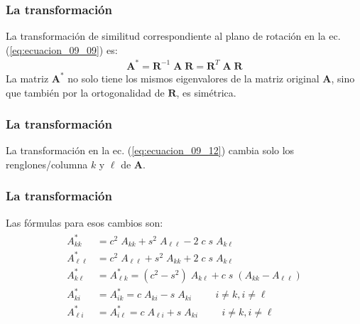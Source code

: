 \documentclass[12pt]{beamer}
\begin{document}
\begin{frame}
\frametitle{La transformación}
La transformación de similitud correspondiente al plano de rotación en la ec. (\ref{eq:ecuacion_09_09}) es:
\pause
\begin{align}
\mathbf{A}^{*} = \mathbf{R}^{-1} \; \mathbf{A \; R} = \mathbf{R}^{T} \; \mathbf{A \; R}
\label{eq:ecuacion_09_12}
\end{align}
\pause
La matriz $\mathbf{A}^{*}$ no solo tiene los mismos eigenvalores de la matriz original $\mathbf{A}$, sino que también por la ortogonalidad de $\mathbf{R}$, es simétrica.
\end{frame}
\begin{frame}
\frametitle{La transformación}
La transformación en la ec. (\ref{eq:ecuacion_09_12}) cambia solo los renglones/columna $k$ y $\ell$ de $\mathbf{A}$.
\end{frame}
\begin{frame}
\frametitle{La transformación}
Las fórmulas para esos cambios son:
\begin{align}
\begin{aligned}
A_{k k}^{*} &= c^{2} \; A_{k k} + s^{2} \; A_{\ell \ell} - 2 \; c \; s \; A_{k \ell} \\
A_{\ell \ell}^{*} &= c^{2} \; A_{\ell \ell} + s^{2} \; A_{k k} + 2 \; c \; s \; A_{k \ell} \\
A_{k \ell}^{*} &= A_{\ell k}^{*} = (c^{2} - s^{2}) \; A_{k \ell} + c \; s \; (A_{k k} - A_{\ell \ell}) \\
A_{k i}^{*} &= A_{i k}^{*} = c \; A_{k i } - s \; A_{k i} \hspace{1cm} i \neq k, i \neq \ell \\
A_{\ell i}^{*} &= A_{i \ell}^{*} = c \; A_{\ell i } + s \; A_{k i} \hspace{1cm} i \neq k, i \neq \ell
\end{aligned}
\label{eq:ecuacion_09_13}
\end{align}
\end{frame}

\end{document}
